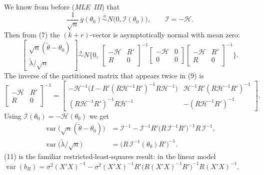 \documentclass[11pt]{article}
\begin{document}
We know from before (\emph{MLE~III}) that
\begin{equation}\tag{8}
 \frac1{\sqrt n}\,g(\theta_{0})\overset{a}{\sim}N\bigl(0,\mathcal I(\theta_{0})\bigr),\qquad\mathcal I=-\mathcal H.
\end{equation}
Then from (7) the $(k+r)$-vector is asymptotically normal with mean zero:
\begin{equation}\tag{9}
 \begin{bmatrix}\sqrt n(\tilde\theta-\theta_{0})\\ \tilde\lambda/\sqrt n\end{bmatrix}
 \overset{a}{\sim}N\Biggl\{0,\
 \begin{bmatrix}-\mathcal H&R'\\ R&0\end{bmatrix}^{-1}
 \begin{bmatrix}-\mathcal H&0\\0&0\end{bmatrix}
 \begin{bmatrix}-\mathcal H&R'\\ R&0\end{bmatrix}^{-1}\Biggr\}.
\end{equation}
The inverse of the partitioned matrix that appears twice in (9) is
\begin{equation}\tag{10}
 \begin{bmatrix}-\mathcal H&R'\\ R&0\end{bmatrix}^{-1}
 =\begin{bmatrix}
   -\mathcal H^{-1}\bigl(I-R'(R\mathcal H^{-1}R')^{-1}R\mathcal H^{-1}\bigr) & \mathcal H^{-1}R'(R\mathcal H^{-1}R')^{-1}\\[4pt]
   (R\mathcal H^{-1}R')^{-1}R\mathcal H^{-1} & -(R\mathcal H^{-1}R')^{-1}
 \end{bmatrix}.
\end{equation}
Using $\mathcal I(\theta_{0})=-\mathcal H(\theta_{0})$ we get
\begin{align}
 \operatorname{var}\bigl(\sqrt n(\tilde\theta-\theta_{0})\bigr)&=\mathcal I^{-1}-\mathcal I^{-1}R'\bigl(R\,\mathcal I^{-1}R'\bigr)^{-1}R\,\mathcal I^{-1}, \tag{11}\\
 \operatorname{var}\bigl(\tilde\lambda/\sqrt n\bigr)&=\bigl(R\,\mathcal I^{-1}(\theta_{0})R'\bigr)^{-1}. \tag{12}
\end{align}
(11) is the familiar restricted-least-squares result: in the linear model
$\operatorname{var}(b_{R})=\sigma^{2}(X'X)^{-1}-\sigma^{2}(X'X)^{-1}R'\bigl(R(X'X)^{-1}R'\bigr)^{-1}R(X'X)^{-1}$.
\end{document}
